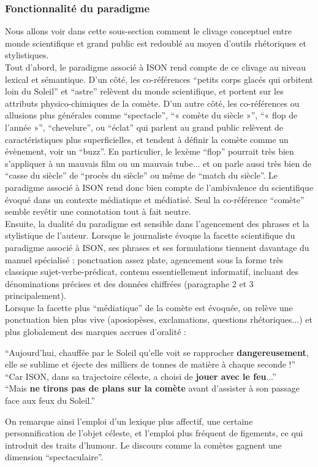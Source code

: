 \documentclass[a4paper,10pt]{article}
\begin{document}
		\subsubsection{Fonctionnalité du paradigme}
			Nous allons voir dans cette sous-section comment le clivage conceptuel entre monde scientifique et grand public est redoublé au moyen d'outils rhétoriques et stylistiques.\\
			Tout d'abord, le paradigme associé à ISON rend compte de ce clivage au niveau lexical et sémantique. D'un côté, les co-références ``petits corps glacés qui orbitent loin du Soleil'' et ``astre'' relèvent du monde scientifique, et portent sur les attributs physico-chimiques de la comète. D'un autre côté, les co-références ou allusions plus générales comme ``spectacle'', ``« comète du siècle »'', ``« flop de l'année »'', ``chevelure'', ou ``éclat'' qui parlent au grand public relèvent de caractéristiques plus superficielles, et tendent à définir la comète comme un évènement, voir un ``buzz''. En particulier, le lexème ``flop'' pourrait très bien s'appliquer à un mauvais film ou un mauvais tube... et on parle aussi très bien de ``casse du siècle'' de ``procès du siècle'' ou même de ``match du siècle''. Le paradigme associé à ISON rend donc bien compte de l'ambivalence du scientifique évoqué dans un contexte médiatique et médiatisé. Seul la co-référence ``comète'' semble revêtir une connotation tout à fait neutre.\\
			
			Ensuite, la dualité du paradigme est sensible dans l'agencement des phrases et la stylistique de l'auteur. Lorsque le journaliste évoque la facette scientifique du paradigme associé à ISON, ses phrases et ses formulations tiennent davantage du manuel spécialisé : ponctuation assez plate, agencement sous la forme très classique sujet-verbe-prédicat, contenu essentiellement informatif, incluant des dénominations précises et des données chiffrées (paragraphe 2 et 3 principalement).\\
			Lorsque la facette plus ``médiatique'' de la comète est évoquée, on relève une ponctuation bien plus vive (aposiopèses, exclamations, questions rhétoriques...) et plus globalement des marques accrues d'oralité :
			\begin{center}
				\footnotesize
				\begin{minipage}{0.7\textwidth}
					``Aujourd'hui, chauffée par le Soleil qu'elle voit se rapprocher \textbf{dangereusement}, elle se sublime et éjecte des milliers de tonnes de matière à chaque seconde !''\\
					``Car ISON, dans sa trajectoire céleste, a choisi de \textbf{jouer avec le feu}...''\\
					``Mais \textbf{ne tirons pas de plans sur la comète} avant d'assister à son passage face aux feux du Soleil.''\\
				\end{minipage}
			\end{center}
			On remarque ainsi l'emploi d'un lexique plus affectif, une certaine personnification de l'objet céleste, et l'emploi plus fréquent de figements, ce qui introduit des traits d'humour. Le discours comme la comètes gagnent une dimension ``spectaculaire''.
\end{document}
